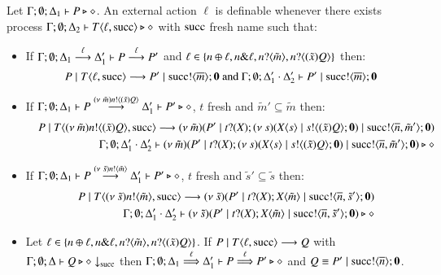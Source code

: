 \begin{definition}[Definibility]\rm
	Let $\Gamma; \emptyset; \Delta_1 \vdash P \triangleright \diamond$.
	An external action $\ell$ is definable whenever
	there exists process
	$\Gamma; \emptyset; \Delta_2 \vdash T\langle \ell, \textrm{succ} \rangle \triangleright \diamond$
	with $\textrm{succ}$ fresh name %
	such that:
%
	\begin{itemize}
		\item	If $\Gamma; \emptyset; \Delta_1 \stackrel{\ell}{\longrightarrow} \Delta_1' \vdash P \stackrel{\ell}{\longrightarrow} P'$ and
			$\ell \in \{n \oplus \ell, n \& \ell, n ? \langle \tilde{m} \rangle, n ? \langle (\tilde{x}) Q \rangle\}$
			then:
%
\[
			P \;|\; T\langle \ell, \textrm{succ} \rangle \longrightarrow P' \;|\; \textrm{succ} ! \langle \overline{m} \rangle ; \mathbf{0} \textrm{ and }
			\Gamma; \emptyset; \Delta_1' \cdot \Delta_2' \vdash P' \;|\; \textrm{succ} ! \langle \overline{m} \rangle ; \mathbf{0}
\]
%
		\item	If $\Gamma; \emptyset; \Delta_1 \vdash P \stackrel{(\nu\ \tilde{m})n ! \langle (\tilde{x})Q \rangle}{\longrightarrow} \Delta_1' \vdash P' \triangleright \diamond$,
			$t$ fresh
			and $\tilde{m}' \subseteq \tilde{m}$
			then:
%
			\begin{eqnarray*}
				& & P \;|\; T\langle (\nu\ \tilde{m})n ! \langle (\tilde{x})Q \rangle, \textrm{succ} \rangle \longrightarrow
				(\nu\ \tilde{m})(P' \;|\; t ? (X) ; (\nu\ s)(X\langle s \rangle \;|\; s ! \langle (\tilde{x}) Q \rangle ; \mathbf{0}) \;|\; \textrm{succ} ! \langle \overline{n}, \tilde{m}' \rangle ; \mathbf{0})\\
				& & \Gamma; \emptyset; \Delta_1' \cdot \Delta_2' \vdash
				(\nu\ \tilde{m})(P' \;|\; t ? (X) ; (\nu\ s)(X\langle s \rangle \;|\; s ! \langle (\tilde{x}) Q \rangle ; \mathbf{0}) \;|\; \textrm{succ} ! \langle \overline{n}, \tilde{m}' \rangle ; \mathbf{0}) \triangleright \diamond
			\end{eqnarray*}
%
		\item	If $\Gamma; \emptyset; \Delta_1 \vdash P \stackrel{(\nu\ \tilde{s})n ! \langle \tilde{m} \rangle}{\longrightarrow} \Delta_1' \vdash P' \triangleright \diamond$,
			$t$ fresh
			and $\tilde{s}' \subseteq \tilde{s}$
			then:
%
			\begin{eqnarray*}
				& & P \;|\; T\langle (\nu\ \tilde{s})n ! \langle \tilde{m} \rangle, \textrm{succ} \rangle \longrightarrow (\nu\ \tilde{s})(P' \;|\; t ? (X) ; X\langle \tilde{m} \rangle \;|\; \textrm{succ} ! \langle \overline{n}, \tilde{s}' \rangle ; \mathbf{0})\\
				& & \Gamma; \emptyset; \Delta_1' \cdot \Delta_2' \vdash (\nu\ \tilde{s})(P' \;|\; t ? (X) ; X\langle \tilde{m} \rangle \;|\; \textrm{succ} ! \langle \overline{n}, \tilde{s}' \rangle ; \mathbf{0}) \triangleright \diamond
			\end{eqnarray*}
%
		\item	Let $\ell \in \{n \oplus \ell, n \& \ell, n ? \langle \tilde{m} \rangle, n ? \langle (\tilde{x}) Q \rangle\}$.
			If $P \;|\; T\langle \ell, \textrm{succ} \rangle \longrightarrow Q$ with			
			$\Gamma; \emptyset; \Delta \vdash Q \triangleright \diamond \downarrow_{\textrm{succ}}$ then 
			$\Gamma; \emptyset; \Delta_1 \stackrel{\ell}{\Longrightarrow} \Delta_1' \vdash P \stackrel{\ell}{\Longrightarrow} P' \triangleright \diamond$
			and $Q \equiv P' \;|\; \textrm{succ} ! \langle \overline{n} \rangle ; \mathbf{0}$.


\end{itemize}
\end{definition}
